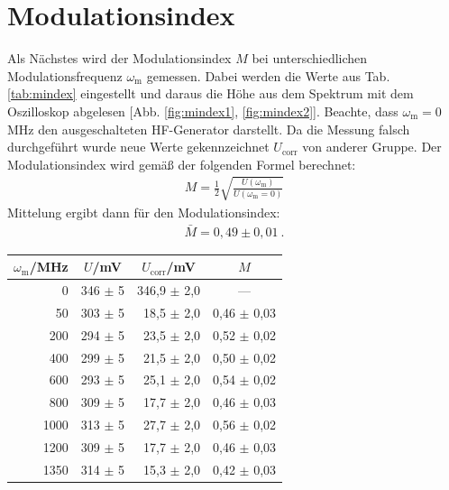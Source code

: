 \newpage
\section{Modulationsindex}
\label{sec:mindex}

Als Nächstes wird der Modulationsindex $M$ bei unterschiedlichen Modulationsfrequenz $\omega_\mathrm{m}$ gemessen. Dabei werden die Werte aus Tab. \ref{tab:mindex} eingestellt und daraus die Höhe aus dem Spektrum mit dem Oszilloskop abgelesen [Abb. \ref{fig:mindex1}, \ref{fig:mindex2}]. Beachte, dass $\omega_\mathrm{m} = 0$\,MHz den ausgeschalteten HF-Generator darstellt. Da die Messung falsch durchgeführt wurde neue Werte gekennzeichnet $U_\mathrm{corr}$ von anderer Gruppe. Der Modulationsindex wird gemäß der folgenden Formel berechnet:
\begin{gather}
    M = \frac{1}{2} \sqrt{\frac{U(\omega_\mathrm{m})}{U(\omega_\mathrm{m} = 0)}}
\end{gather}
Mittelung ergibt dann für den Modulationsindex:
\begin{gather}
    \boxed{\bar{M} = 0,49 \pm 0,01}~.
\end{gather}
\begin{center}
    \captionsetup{type=table}
    \begin{tabular}{r | c | c c}
        $\omega_\mathrm{m}$/MHz & $U$/mV & $U_\mathrm{corr}$/mV & $M$ \\ \hline
        0    & 346 $\pm$ 5 & 346,9 $\pm$ 2,0  & --- \\
        50   & 303 $\pm$ 5 & ~18,5  $\pm$ 2,0 & 0,46 $\pm$ 0,03 \\
        200  & 294 $\pm$ 5 & ~23,5  $\pm$ 2,0 & 0,52 $\pm$ 0,02 \\
        400  & 299 $\pm$ 5 & ~21,5  $\pm$ 2,0 & 0,50 $\pm$ 0,02 \\
        600  & 293 $\pm$ 5 & ~25,1  $\pm$ 2,0 & 0,54 $\pm$ 0,02 \\
        800  & 309 $\pm$ 5 & ~17,7  $\pm$ 2,0 & 0,46 $\pm$ 0,03 \\
        1000 & 313 $\pm$ 5 & ~27,7  $\pm$ 2,0 & 0,56 $\pm$ 0,02 \\
        1200 & 309 $\pm$ 5 & ~17,7  $\pm$ 2,0 & 0,46 $\pm$ 0,03 \\
        1350 & 314 $\pm$ 5 & ~15,3  $\pm$ 2,0 & 0,42 $\pm$ 0,03 \\
    \end{tabular}
    \label{tab:mindex}
\end{center}

